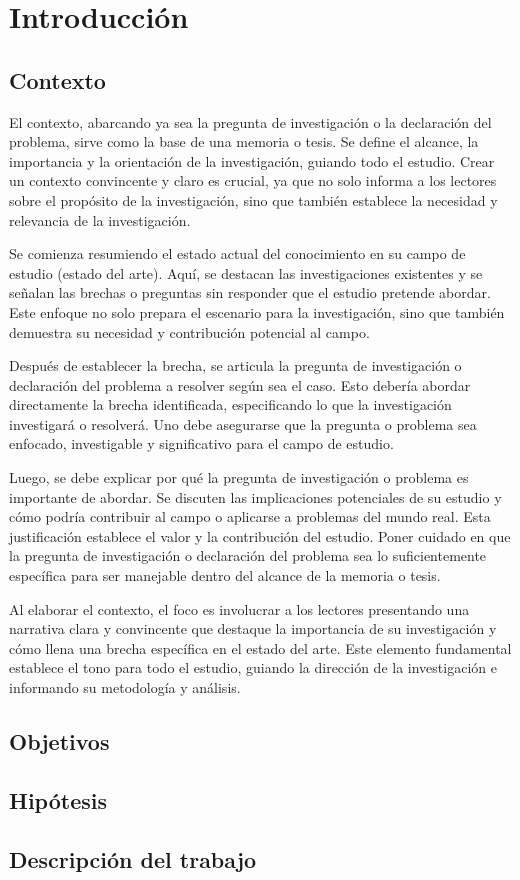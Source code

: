 \section{Introducción}

\subsection{Contexto}
El contexto, abarcando ya sea la pregunta de investigación o la declaración del problema, sirve como la base de una memoria o tesis. Se define el alcance, la importancia y la orientación de la investigación, guiando todo el estudio. Crear un contexto convincente y claro es crucial, ya que no solo informa a los lectores sobre el propósito de la investigación, sino que también establece la necesidad y relevancia de la investigación.

Se comienza resumiendo el estado actual del conocimiento en su campo de estudio (estado del arte). Aquí, se destacan las investigaciones existentes y se señalan las brechas o preguntas sin responder que el estudio pretende abordar. Este enfoque no solo prepara el escenario para la investigación, sino que también demuestra su necesidad y contribución potencial al campo.

Después de establecer la brecha, se articula la pregunta de investigación o declaración del problema a resolver según sea el caso. Esto debería abordar directamente la brecha identificada, especificando lo que la investigación investigará o resolverá. Uno debe asegurarse que la pregunta o problema sea enfocado, investigable y significativo para el campo de estudio.

Luego, se debe explicar por qué la pregunta de investigación o problema es importante de abordar. Se discuten las implicaciones potenciales de su estudio y cómo podría contribuir al campo o aplicarse a problemas del mundo real. Esta justificación establece el valor y la contribución del estudio. Poner cuidado en que la pregunta de investigación o declaración del problema sea lo suficientemente específica para ser manejable dentro del alcance de la memoria o tesis. 

Al elaborar el contexto, el foco es involucrar a los lectores presentando una narrativa clara y convincente que destaque la importancia de su investigación y cómo llena una brecha específica en el estado del arte. Este elemento fundamental establece el tono para todo el estudio, guiando la dirección de la investigación e informando su metodología y análisis.

\subsection{Objetivos}
\lipsum[4]

\subsection{Hipótesis}
\lipsum[5-6]

\subsection{Descripción del trabajo}
\lipsum[7-9]




